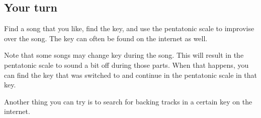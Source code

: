 \subsection{Your turn}

Find a song that you like, find the key, and use the pentatonic scale to improvise over the song. The key can often be found on the internet as well.

Note that some songs may change key during the song. This will result in the pentatonic scale to sound a bit off during those parts. When that happens, you can find the key that was switched to and continue in the pentatonic scale in that key.

Another thing you can try is to search for backing tracks in a certain key on the internet.